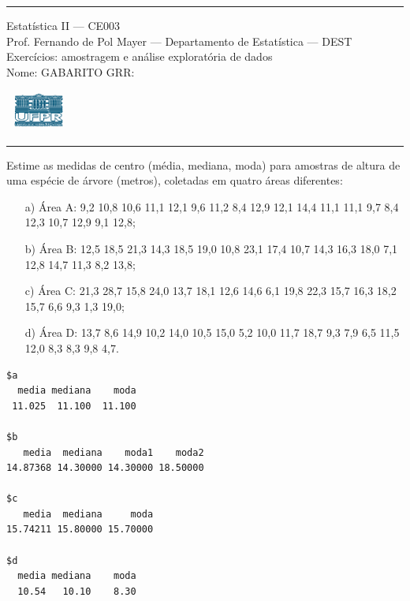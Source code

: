 \documentclass[a4paper,11pt,fleqn]{article}\usepackage[]{graphicx}\usepackage[]{color}
\makeatletter
\newenvironment{kframe}{%
 \def\at@end@of@kframe{}%
 \ifinner\ifhmode%
  \def\at@end@of@kframe{\end{minipage}}%
  \begin{minipage}{\columnwidth}%
 \fi\fi%
 \def\FrameCommand##1{\hskip\@totalleftmargin \hskip-\fboxsep
 \colorbox{shadecolor}{##1}\hskip-\fboxsep
     \hskip-\linewidth \hskip-\@totalleftmargin \hskip\columnwidth}%
 \MakeFramed {\advance\hsize-\width
   \@totalleftmargin\z@ \linewidth\hsize
   \@setminipage}}%
 {\par\unskip\endMakeFramed%
 \at@end@of@kframe}
\newenvironment{knitrout}{}{} %
\theoremstyle{definition}
\makeatother
\begin{document}
\reversemarginpar %





\hrule
\vspace{0.3cm}

\begin{minipage}[c]{.85\textwidth}
  Estatística II --- CE003 \\
  Prof. Fernando de Pol Mayer --- Departamento de Estatística --- DEST \\
  Exercícios: amostragem e análise exploratória de dados \\
  Nome: GABARITO  \hfill GRR: \hspace{2cm}
\end{minipage}\hfill
\begin{minipage}[c]{.15\textwidth}
\flushright
\includegraphics[width=2.2cm]{../img/ufpr-logo.png}
\end{minipage}

\vspace{0.3cm}
\hrule
\vspace{0.3cm}

\begin{compactenum}[1.]
\item Estime as medidas de centro (média, mediana,
  moda) para amostras de altura de uma espécie de árvore (metros),
  coletadas em quatro áreas diferentes:
  \begin{itemize}
  \item[a)] Área A: 9,2 10,8 10,6 11,1 12,1 9,6 11,2 8,4 12,9 12,1
    14,4 11,1 11,1 9,7 8,4 12,3 10,7 12,9 9,1 12,8;
  \item[b)] Área B: 12,5 18,5 21,3 14,3 18,5 19,0 10,8 23,1 17,4 10,7
    14,3 16,3 18,0 7,1 12,8 14,7 11,3 8,2 13,8;
  \item[c)] Área C: 21,3 28,7 15,8 24,0 13,7 18,1 12,6 14,6 6,1 19,8
    22,3 15,7 16,3 18,2 15,7 6,6 9,3 1,3 19,0;
  \item[d)] Área D: 13,7 8,6 14,9 10,2 14,0 10,5 15,0 5,2 10,0 11,7
    18,7 9,3 7,9 6,5 11,5 12,0 8,3 8,3 9,8 4,7.
  \end{itemize}
\begin{knitrout}\small
{}\color{fgcolor}\begin{kframe}
\begin{verbatim}
$a
  media mediana    moda 
 11.025  11.100  11.100 

$b
   media  mediana    moda1    moda2 
14.87368 14.30000 14.30000 18.50000 

$c
   media  mediana     moda 
15.74211 15.80000 15.70000 

$d
  media mediana    moda 
  10.54   10.10    8.30 
\end{verbatim}
\end{kframe}
\end{knitrout}
\end{compactenum}
\end{document}
